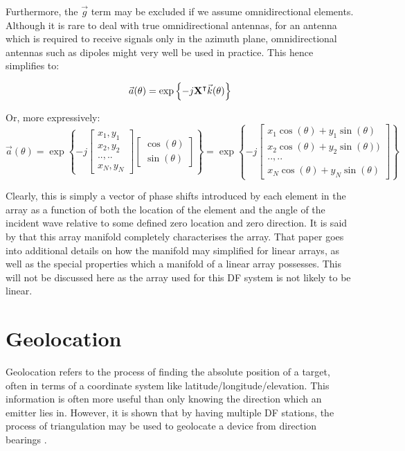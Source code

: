 Furthermore, the \(\vec{g}\) term may be excluded if we assume omnidirectional elements. Although it is rare to deal with true omnidirectional antennas, for an antenna which is required to receive signals only in the azimuth plane, omnidirectional antennas such as dipoles might very well be used in practice. This hence simplifies to:

\begin{equation}
  \vec{a}(\theta) = \exp \left\{ -j \mathbf{X}^\intercal \vec{k}(\theta) \right\}
\end{equation}

Or, more expressively:
\begin{equation}
\vec{a}(\theta) = \exp \left\{ -j \begin{bmatrix} x_1, y_1 \\ x_2, y_2 \\ .., .. \\ x_N, y_N \end{bmatrix} \begin{bmatrix} \cos(\theta) \\ \sin(\theta) \end{bmatrix} \right\}
= \exp \left\{ -j \begin{bmatrix} x_1\cos(\theta) + y_1\sin(\theta) \\ x_2\cos(\theta) + y_2\sin(\theta)) \\ .., .. \\ x_N\cos(\theta) + y_N\sin(\theta) \end{bmatrix} \right\}
\end{equation}

Clearly, this is simply a vector of phase shifts introduced by each element in the array as a function of both the location of the element and the angle of the incident wave relative to some defined zero location and zero direction. It is said by \cite{dacos1995estimating} that this array manifold completely characterises the array. That paper goes into additional details on how the manifold may simplified for linear arrays, as well as the special properties which a manifold of a linear array possesses. This will not be discussed here as the array used for this DF system is not likely to be linear. 

\section{Geolocation}
Geolocation refers to the process of finding the absolute position of a target, often in terms of a coordinate system like latitude/longitude/elevation. This information is often more useful than only knowing the direction which an emitter lies in. However, it is shown that by having multiple DF stations, the process of triangulation may be used to geolocate a device from direction bearings \cite{poisel2012electronic}. 

